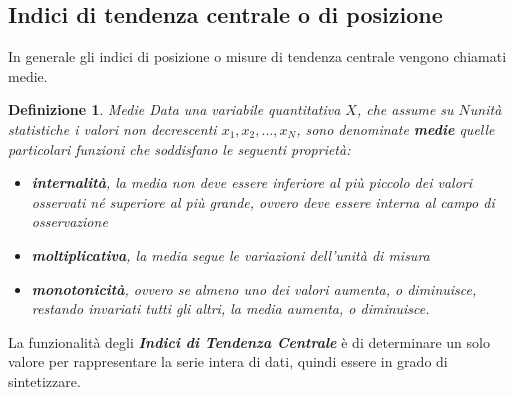 \documentclass{article}
\newtheorem{definition}{Definizione}[section]
\begin{document}
    \subsection{Indici di tendenza  centrale o di posizione}
    In generale gli indici di posizione o misure di tendenza centrale vengono chiamati medie.
    \begin{definition}{Medie}
    Data una variabile quantitativa $X$, che assume su $N$unità statistiche i valori non decrescenti $x_1, x_2,...,x_N$, sono denominate \textbf{medie} quelle particolari funzioni che soddisfano le seguenti proprietà:  
      \begin{itemize}
        \item \textbf{internalità}, la media non deve essere inferiore al   più piccolo dei valori osservati né superiore al più grande,     ovvero deve essere interna al campo di osservazione
        \item \textbf{moltiplicativa}, la media segue le variazioni         dell’unità di misura
        \item \textbf{monotonicità}, ovvero se almeno uno dei valori         aumenta, o diminuisce, restando invariati tutti gli altri, la     media aumenta, o diminuisce.
        \end{itemize}{}
      \end{definition}
    

    La funzionalità degli \textbf{\textit{Indici di Tendenza Centrale}} è di determinare un solo valore per rappresentare la serie intera di dati, quindi essere in grado di sintetizzare. 
    
\end{document}
